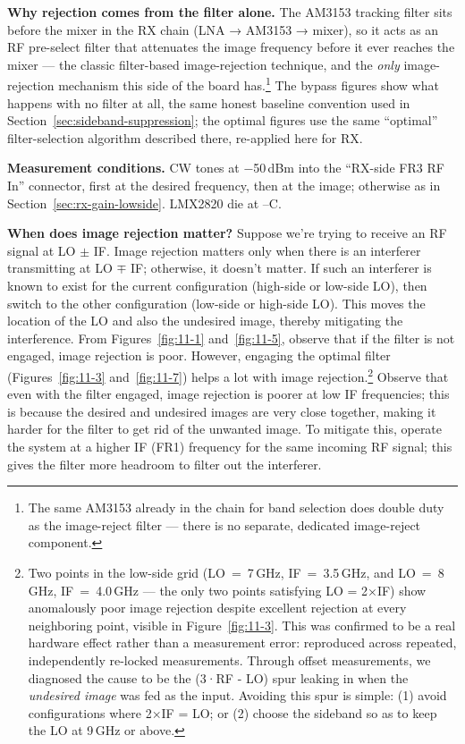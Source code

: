\textbf{Why rejection comes from the filter alone.} The AM3153 tracking filter sits before the mixer in the RX
chain (LNA → AM3153 → mixer), so it acts as an RF pre-select filter that attenuates the image frequency
before it ever reaches the mixer --- the classic filter-based image-rejection technique, and the \emph{only}
image-rejection mechanism this side of the board has.\footnote{The same AM3153 already in the chain for band
selection does double duty as the image-reject filter --- there is no separate, dedicated image-reject
component.} The bypass figures show what happens with no filter at all, the same honest baseline convention
used in Section~\ref{sec:sideband-suppression}; the optimal figures use the same ``optimal'' filter-selection
algorithm described there, re-applied here for RX.

\textbf{Measurement conditions.} CW tones at −50\,dBm into the ``RX-side FR3 RF In'' connector, first at the desired frequency, then at the image; otherwise as in Section~\ref{sec:rx-gain-lowside}. LMX2820 die at \condRxImageMinC--\condRxImageMaxC\textdegree C.

\textbf{When does image rejection matter?} Suppose we're trying to receive an RF signal at LO $\pm$ IF. Image
rejection matters only when there is an interferer transmitting at LO $\mp$ IF; otherwise, it doesn't matter. If
such an interferer is known to exist for the current
configuration (high-side or low-side LO), then switch to the other configuration (low-side or high-side LO).
This moves the location of the LO and also the undesired image, thereby mitigating the interference. From
Figures~\ref{fig:11-1} and~\ref{fig:11-5}, observe that if the filter is not engaged, image rejection is poor.
However, engaging the optimal filter (Figures~\ref{fig:11-3} and~\ref{fig:11-7}) helps a lot with image
rejection.\footnote{Two points in the low-side grid (LO~=~7\,GHz, IF~=~3.5\,GHz, and LO~=~8\,GHz, IF~=~4.0\,GHz
--- the only two points satisfying LO = 2×IF) show anomalously poor image rejection despite excellent rejection at every neighboring point, visible in Figure~\ref{fig:11-3}. This was
confirmed to be a real hardware effect rather than a measurement error: reproduced across repeated,
independently re-locked measurements. Through offset measurements, we diagnosed the cause to be the
(3·RF - LO) spur leaking in when the \emph{undesired image} was fed as the input. Avoiding
this spur is simple: (1) avoid configurations where 2×IF = LO; or (2) choose the sideband
so as to keep the LO at 9\,GHz or above.}\xdef\imgrejoutlierfn{\therealfootnote}%
 Observe that even with the filter engaged, image rejection is poorer at low IF frequencies; this is
because the desired and undesired images are very close together, making it harder for the filter to get rid of
the unwanted image. To mitigate this, operate the system at a higher IF (FR1) frequency for the same incoming RF
signal; this gives the filter more headroom to filter out the interferer.

